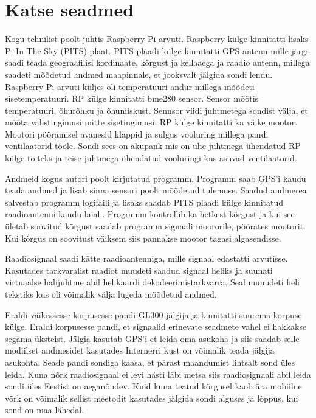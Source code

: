 \documentclass{trkut}%
\begin{document}
\section{Katse seadmed}
Kogu tehnilist poolt juhtis Raspberry Pi arvuti. Raspberry külge kinnitatti lisaks Pi In The Sky (PITS) plaat. PITS plaadi külge kinnitatti GPS antenn mille järgi saadi teada geograafilisi kordinaate, kõrgust ja kellaaega ja raadio antenn, millega saadeti mõõdetud andmed maapinnale, et jooksvalt jälgida sondi lendu. Raspberry Pi arvuti küljes oli temperatuuri andur millega mõõdeti sisetemperatuuri. RP külge kinnitatti bme280 sensor. Sensor mõõtis temperatuuri, õhurõhku ja õhuniiskust. Sennsor viidi juhtmetega sondist välja, et mõõta välistingimusi mitte sisetingimusi. RP külge kinnitatti ka väike mootor. Mootori pööramisel avanesid klappid ja sulgus vooluring millega pandi ventilaatorid tööle. Sondi sees on akupank mis on ühe juhtmega ühendatud RP külge toiteks ja teise juhtmega ühendatud vooluringi kus asuvad ventilaatorid.

Andmeid kogus autori poolt kirjutatud programm. Programm saab GPS'i kaudu teada andmed ja lisab sinna sensori poolt mõõdetud tulemuse. Saadud andmerea salvestab programm logifaili ja lisaks saadab PITS plaadi külge kinnitatud raadioantenni kaudu laiali. Programm kontrollib ka hetkest kõrgust ja kui see ületab soovitud kõrgust saadab programm signaali moororile, pöörates mootorit. Kui kõrgus on soovitust väiksem siis pannakse mootor tagasi algasendisse.

Raadiosignaal saadi kätte raadioantenniga, mille signaal edastatti arvutisse. Kasutades tarkvaralist raadiot muudeti saadud signaal heliks ja suunati virtuaalse halijuhtme abil helikaardi dekodeerimistarkvarra. Seal muuudeti heli tekstiks kus oli võimalik välja lugeda mõõdetud andmed.

Eraldi väikessesse korpusesse pandi GL300 jälgija ja kinnitatti suurema korpuse külge. Eraldi korpusesse pandi, et signaalid erinevate seadmete vahel ei hakkakse segama üksteist. Jälgia kasutab GPS'i et leida oma asukoha ja siis saadab selle modiilset andmesidet kasutades Internerri kust on võimalik teada jälgija asukohta. Seade pandi sondiga kaasa, et pärast maandumist lihtsalt sond üles leida. Kuna nõrk raadiosignaal ei levi hästi läbi metsa siis raadiosignaali abil leida sondi üles Eestist on aeganõudev. Kuid kuna teatud kõrgusel kaob ära mobiilne võrk on võimalik sellist meetodit kasutades jälgida sondi alguses ja lõppus, kui sond on maa lähedal.
\end{document}
